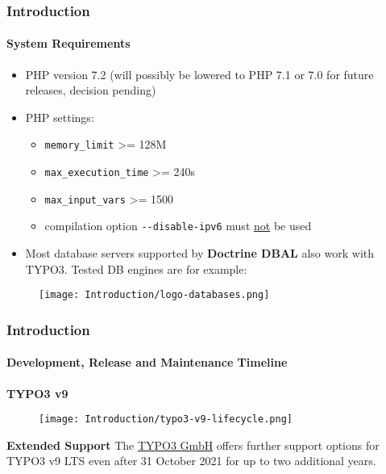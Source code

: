 \begin{frame}[fragile]
	\frametitle{Introduction}
	\framesubtitle{System Requirements}

	\begin{itemize}
		\item PHP version 7.2\newline
			\smaller
				(will possibly be lowered to PHP 7.1 or 7.0 for future releases, decision pending)
			\normalsize

		\item PHP settings:

			\begin{itemize}
				\item \texttt{memory\_limit} >= 128M
				\item \texttt{max\_execution\_time} >= 240s
				\item \texttt{max\_input\_vars} >= 1500
				\item compilation option \texttt{-}\texttt{-disable-ipv6} must \underline{not} be used
			\end{itemize}

		\item Most database servers supported by \textbf{Doctrine DBAL} also work with TYPO3.
			Tested DB engines are for example:
	\end{itemize}

	\begin{figure}
		\texttt{[image: Introduction/logo-databases.png]}
	\end{figure}

\end{frame}

\begin{frame}[fragile]
	\frametitle{Introduction}
	\framesubtitle{Development, Release and Maintenance Timeline}

	\textbf{TYPO3 v9}

	\begin{figure}
		\texttt{[image: Introduction/typo3-v9-lifecycle.png]}
	\end{figure}

	\textbf{Extended Support}\newline
	\smaller
		The \href{https://typo3.com}{TYPO3 GmbH} offers further support options
		for TYPO3 v9 LTS even after 31 October 2021 for up to two additional
		years.
	\normalsize


\end{frame}

